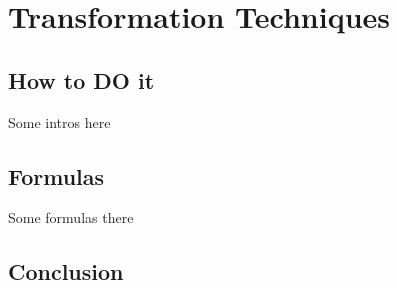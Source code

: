 \usepackage{shazin}
\chapter{Transformation Techniques}
\section*{How to DO it}
Some intros here
\section*{Formulas}
Some formulas there
\section*{Conclusion}